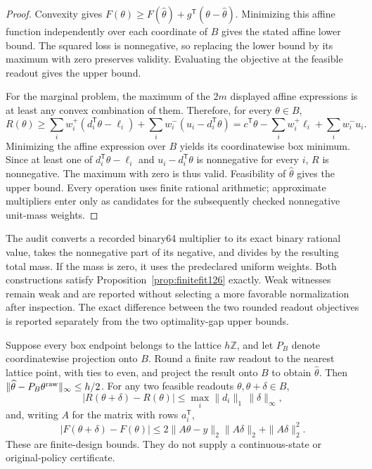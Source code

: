 \begin{proof}
Convexity gives
$F(\theta)\geq F(\widehat\theta)+g^{\mathsf T}(\theta-\widehat\theta)$.
Minimizing this affine function independently over each coordinate of $B$
gives the stated affine lower bound.  The squared loss is nonnegative, so
replacing the lower bound by its maximum with zero preserves validity.
Evaluating the objective at the feasible readout gives the upper bound.

For the marginal problem, the maximum of the $2m$ displayed affine
expressions is at least any convex combination of them.  Therefore, for every
$\theta\in B$,
\[
 R(\theta)\geq
 \sum_iw_i^+(d_i^{\mathsf T}\theta-\ell_i)
 +\sum_iw_i^-(u_i-d_i^{\mathsf T}\theta)
 =c^{\mathsf T}\theta-\sum_iw_i^+\ell_i+\sum_iw_i^-u_i.
\]
Minimizing the affine expression over $B$ yields its coordinatewise box
minimum.  Since at least one of
$d_i^{\mathsf T}\theta-\ell_i$ and $u_i-d_i^{\mathsf T}\theta$ is
nonnegative for every $i$, $R$ is nonnegative.  The maximum with zero is thus
valid.  Feasibility of $\widehat\theta$ gives the upper bound.  Every operation
uses finite rational arithmetic; approximate multipliers enter only as
candidates for the subsequently checked nonnegative unit-mass weights.
\end{proof}

The audit converts a recorded binary64 multiplier to its exact binary
rational value, takes the nonnegative part of its negative, and divides by the
resulting total mass.  If the mass is zero, it uses the predeclared uniform
weights.  Both constructions satisfy Proposition~\ref{prop:finitefit126}
exactly.  Weak witnesses remain weak and are reported without selecting a
more favorable normalization after inspection.  The exact difference between
the two rounded readout objectives is reported separately from the two
optimality-gap upper bounds.

\begin{proposition}
\label{prop:roundfit126}
Suppose every box endpoint belongs to the lattice $h\mathbb Z$, and let
$P_B$ denote coordinatewise projection onto $B$.  Round a finite raw readout
to the nearest lattice point, with ties to even, and project the result onto
$B$ to obtain $\widehat\theta$.  Then
$\|\widehat\theta-P_B\theta^{\rm raw}\|_\infty\leq h/2$.
For any two feasible readouts $\theta,\theta+\delta\in B$,
\[
 |R(\theta+\delta)-R(\theta)|
       \leq\max_i\|d_i\|_1\,\|\delta\|_\infty,
\]
and, writing $A$ for the matrix with rows $a_i^{\mathsf T}$,
\[
 |F(\theta+\delta)-F(\theta)|
 \leq2\|A\theta-y\|_2\|A\delta\|_2+\|A\delta\|_2^2.
\]
These are finite-design bounds.  They do not supply a continuous-state or
original-policy certificate.
\end{proposition}

